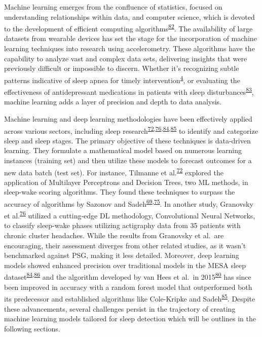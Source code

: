 \documentclass[
  10pt,
]{scrbook}
\begin{document}
Machine learning emerges from the confluence of statistics, focused on
understanding relationships within data, and computer science, which is
devoted to the development of efficient computing
algorithms\textsuperscript{\protect\hyperlink{ref-hastie01statisticallearning}{82}}.
The availability of large datasets from wearable devices has set the
stage for the incorporation of machine learning techniques into research
using accelerometry. These algorithms have the capability to analyze
vast and complex data sets, delivering insights that were previously
difficult or impossible to discern. Whether it's recognizing subtle
patterns indicative of sleep apnea for timely
intervention\textsuperscript{\protect\hyperlink{ref-cappuccio_sleep_2010}{4}},
or evaluating the effectiveness of antidepressant medications in
patients with sleep
disturbances\textsuperscript{\protect\hyperlink{ref-paruthi_consensus_2016}{83}},
machine learning adds a layer of precision and depth to data analysis.

Machine learning and deep learning methodologies have been effectively
applied across various sectors, including sleep
research\textsuperscript{\protect\hyperlink{ref-tilmanne_2009}{72},\protect\hyperlink{ref-granovsky_actigraphy-based_2018}{76},\protect\hyperlink{ref-palotti_benchmark_2019}{84},\protect\hyperlink{ref-sundararajan_sleep_2021}{85}}
to identify and categorize sleep and sleep stages. The primary objective
of these techniques is data-driven learning. They formulate a
mathematical model based on numerous learning instances (training set)
and then utilize these models to forecast outcomes for a new data batch
(test set). For instance, Tilmanne et
al.\textsuperscript{\protect\hyperlink{ref-tilmanne_2009}{72}} explored
the application of Multilayer Perceptrons and Decision Trees, two ML
methods, in sleep-wake scoring algorithms. They found these techniques
to surpass the accuracy of algorithms by Sazonov and
Sadeh\textsuperscript{\protect\hyperlink{ref-sadeh_activity-based_1994}{69},\protect\hyperlink{ref-sazonov_activity-based_2004}{75}}.
In another study, Granovsky et
al.\textsuperscript{\protect\hyperlink{ref-granovsky_actigraphy-based_2018}{76}}
utilized a cutting-edge DL methodology, Convolutional Neural Networks,
to classify sleep-wake phases utilizing actigraphy data from 35 patients
with chronic cluster headaches. While the results from Granovsky et
al.~are encouraging, their assessment diverges from other related
studies, as it wasn't benchmarked against PSG, making it less detailed.
Moreover, deep learning models showed enhanced precision over
traditional models in the MESA sleep
dataset\textsuperscript{\protect\hyperlink{ref-palotti_benchmark_2019}{84},\protect\hyperlink{ref-lutsey_objectively_2015}{86}}
and the algorithm developed by van Hees et al.~in
2015\textsuperscript{\protect\hyperlink{ref-hees_novel_2015}{80}} has
since been improved in accuracy with a random forest model that
outperformed both its predecessor and established algorithms like
Cole-Kripke and
Sadeh\textsuperscript{\protect\hyperlink{ref-sundararajan_sleep_2021}{85}}.
Despite these advancements, several challenges persist in the trajectory
of creating machine learning models tailored for sleep detection which
will be outlines in the following sections.
\end{document}
